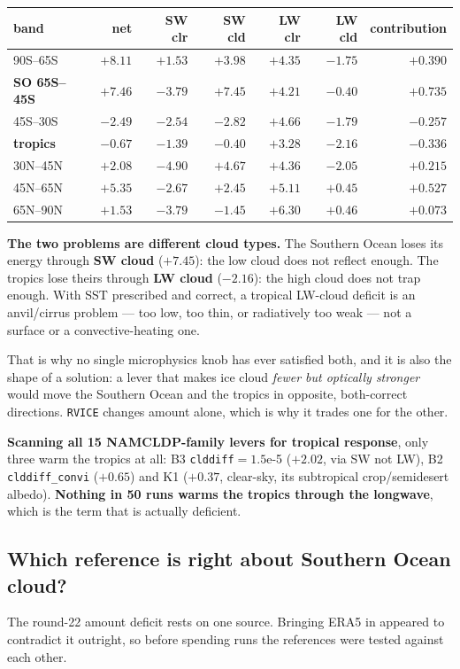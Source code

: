 \documentclass[10pt]{article}
\begin{document}
\begin{center}\footnotesize
\begin{tabular}{l r r r r r r}
\toprule
band & net & SW clr & \textbf{SW cld} & LW clr & \textbf{LW cld} & contribution \\
\midrule
90S--65S & $+8.11$ & $+1.53$ & $+3.98$ & $+4.35$ & $-1.75$ & $+0.390$ \\
\textbf{SO 65S--45S} & $+7.46$ & $-3.79$ & $\mathbf{+7.45}$ & $+4.21$ & $-0.40$ & $\mathbf{+0.735}$ \\
45S--30S & $-2.49$ & $-2.54$ & $-2.82$ & $+4.66$ & $-1.79$ & $-0.257$ \\
\textbf{tropics} & $-0.67$ & $-1.39$ & $-0.40$ & $+3.28$ & $\mathbf{-2.16}$ & $-0.336$ \\
30N--45N & $+2.08$ & $-4.90$ & $+4.67$ & $+4.36$ & $-2.05$ & $+0.215$ \\
45N--65N & $+5.35$ & $-2.67$ & $+2.45$ & $+5.11$ & $+0.45$ & $+0.527$ \\
65N--90N & $+1.53$ & $-3.79$ & $-1.45$ & $+6.30$ & $+0.46$ & $+0.073$ \\
\bottomrule
\end{tabular}
\end{center}

\noindent \textbf{The two problems are different cloud types.} The Southern Ocean loses its
energy through \textbf{SW cloud} ($+7.45$): the low cloud does not reflect enough. The tropics
lose theirs through \textbf{LW cloud} ($-2.16$): the high cloud does not trap enough. With SST
prescribed and correct, a tropical LW-cloud deficit is an anvil/cirrus problem --- too low, too
thin, or radiatively too weak --- not a surface or a convective-heating one.

That is why no single microphysics knob has ever satisfied both, and it is also the shape of a
solution: a lever that makes ice cloud \emph{fewer but optically stronger} would move the
Southern Ocean and the tropics in opposite, both-correct directions. \texttt{RVICE} changes
amount alone, which is why it trades one for the other.

\textbf{Scanning all 15 NAMCLDP-family levers for tropical response}, only three warm the
tropics at all: B3 \texttt{clddiff}$=1.5$e-5 ($+2.02$, via SW not LW), B2
\texttt{clddiff\_convi} ($+0.65$) and K1 ($+0.37$, clear-sky, its subtropical
crop/semidesert albedo). \textbf{Nothing in 50 runs warms the tropics through the longwave},
which is the term that is actually deficient.

\subsection{Which reference is right about Southern Ocean cloud?}\label{sub:r23ref}
The round-22 amount deficit rests on one source. Bringing ERA5 in appeared to contradict it
outright, so before spending runs the references were tested against each other.
\end{document}
